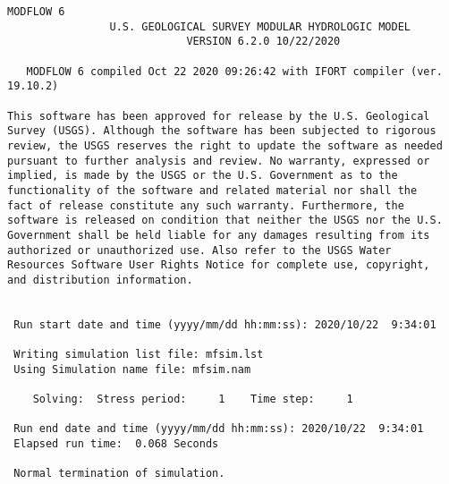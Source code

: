 {\small
\begin{lstlisting}[style=modeloutput]
                                   MODFLOW 6
                U.S. GEOLOGICAL SURVEY MODULAR HYDROLOGIC MODEL
                            VERSION 6.2.0 10/22/2020

   MODFLOW 6 compiled Oct 22 2020 09:26:42 with IFORT compiler (ver. 19.10.2)

This software has been approved for release by the U.S. Geological
Survey (USGS). Although the software has been subjected to rigorous
review, the USGS reserves the right to update the software as needed
pursuant to further analysis and review. No warranty, expressed or
implied, is made by the USGS or the U.S. Government as to the
functionality of the software and related material nor shall the
fact of release constitute any such warranty. Furthermore, the
software is released on condition that neither the USGS nor the U.S.
Government shall be held liable for any damages resulting from its
authorized or unauthorized use. Also refer to the USGS Water
Resources Software User Rights Notice for complete use, copyright,
and distribution information.


 Run start date and time (yyyy/mm/dd hh:mm:ss): 2020/10/22  9:34:01

 Writing simulation list file: mfsim.lst
 Using Simulation name file: mfsim.nam

    Solving:  Stress period:     1    Time step:     1

 Run end date and time (yyyy/mm/dd hh:mm:ss): 2020/10/22  9:34:01
 Elapsed run time:  0.068 Seconds

 Normal termination of simulation.

\end{lstlisting}
}
